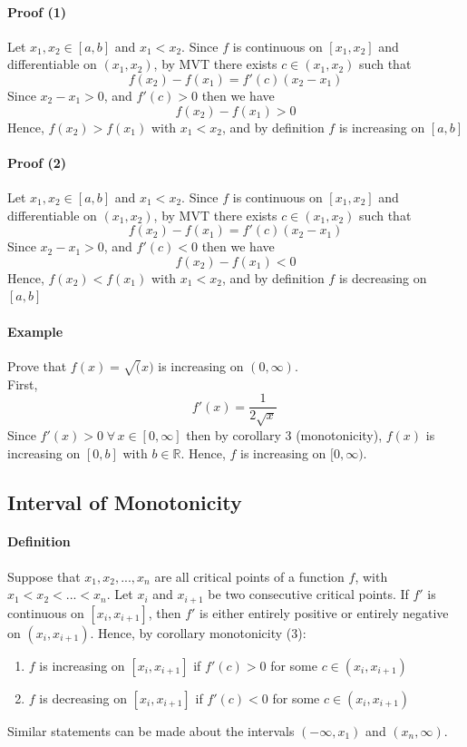 \documentclass[12pt]{article}
\begin{document}
\paragraph{Proof (1)}
Let $x_1, x_2 \in [a, b]$ and $x_1 < x_2$. Since $f$ is continuous on $[x_1, x_2]$ and differentiable
on $(x_1, x_2)$, by MVT there exists $c \in (x_1, x_2)$ such that
\[
    f(x_2) - f(x_1) = f'(c)(x_2 - x_1)
\]
Since $x_2 - x_1 > 0$, and $f'(c) > 0$ then we have
\[
  f(x_2) - f(x_1) > 0
\]
Hence, $f(x_2) > f(x_1)$ with $x_1 < x_2$, and by definition $f$ is increasing on $[a, b]$

\paragraph{Proof (2)}
Let $x_1, x_2 \in [a, b]$ and $x_1 < x_2$. Since $f$ is continuous on $[x_1, x_2]$ and differentiable
on $(x_1, x_2)$, by MVT there exists $c \in (x_1, x_2)$ such that
\[
    f(x_2) - f(x_1) = f'(c)(x_2 - x_1)
\]
Since $x_2 - x_1 > 0$, and $f'(c) < 0$ then we have
\[
  f(x_2) - f(x_1) < 0
\]
Hence, $f(x_2) < f(x_1)$ with $x_1 < x_2$, and by definition $f$ is decreasing on $[a, b]$

\paragraph{Example} Prove that $f(x) = \sqrt(x)$ is increasing on $(0, \infty)$. \\
First,
\[
  f'(x) = \frac{1}{2\sqrt{x}}\, 
\]
Since $f'(x) > 0 \; \forall \, x \in [0, \infty]$ then by corollary 3 (monotonicity), $f(x)$ is increasing
on $[0, b]$ with $b \in \mathbb{R}$. Hence, $f$ is increasing on $[0, \infty)$.
\subsection{Interval of Monotonicity}
\paragraph{Definition}
Suppose that $x_1, x_2, ..., x_n$ are all critical points of a function $f$, with $x_1 < x_2 < ... < x_n$.
Let $x_i$ and $x_{i+1}$ be two consecutive critical points. If $f'$ is continuous on $[x_i, x_{i + 1}]$, 
then $f'$ is either entirely positive or entirely negative on $(x_i, x_{i+1})$. Hence, by corollary monotonicity (3):
\begin{enumerate} 
    \item $f$ is increasing on $[x_i, x_{i+1}]$ if $f'(c) > 0$ for some $c \in (x_i, x_{i+1})$
    \item $f$ is decreasing on $[x_i, x_{i+1}]$ if $f'(c) < 0$ for some $c \in (x_i, x_{i+1})$
\end{enumerate}
Similar statements can be made about the intervals $(-\infty, x_1)$ and $(x_n, \infty)$.
\end{document}
